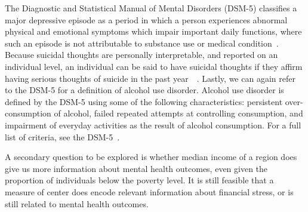 \documentclass{article}
\begin{document}
The Diagnostic and Statistical Manual of Mental Disorders (DSM-5)
classifies a major depressive episode as
a period in which a person experiences
abnormal physical and emotional symptoms
which impair important daily functions,
where such an episode is not attributable to
substance use or medical condition~\cite{apa_2013}.
Because suicidal thoughts are personally interpretable,
and reported on an individual level,
an individual can be said to have
suicidal thoughts if they affirm
having serious thoughts of suicide
in the past year~\cite{samhsa_data}~\cite{apa_2013}.
Lastly, we can again refer to the DSM-5
for a definition of alcohol use disorder.
Alcohol use disorder is defined by the DSM-5
using some of the following characteristics:
persistent over-consumption of alcohol,
failed repeated attempts at controlling consumption,
and impairment of everyday activities
as the result of alcohol consumption.
For a full list of criteria, see the DSM-5~\cite{apa_2013}.


A secondary question
to be explored is whether
median income of a region does give us more information about mental
health outcomes, even given the proportion of individuals below the
poverty level. It is still feasible that a measure of center does encode
relevant information about financial stress, or is still related to
mental health outcomes.
\end{document}
